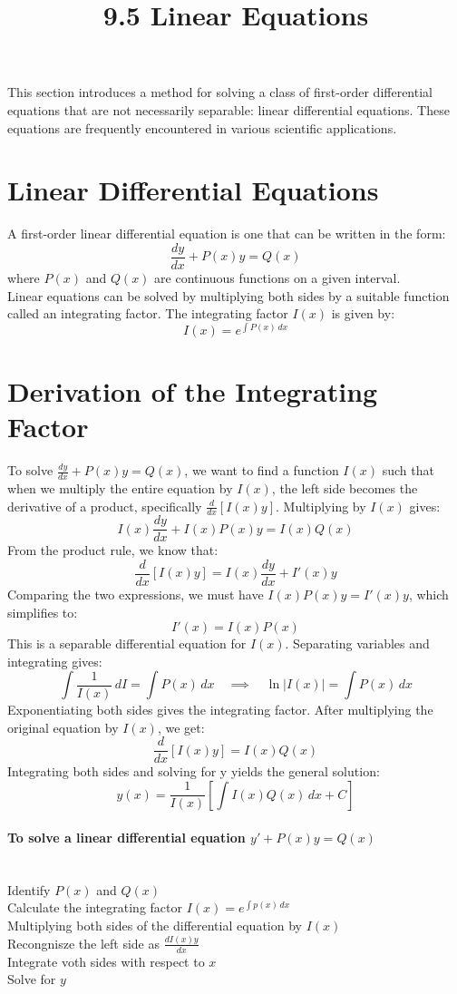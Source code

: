 \documentclass{article}
\title{9.5 Linear Equations}
\date{}
\begin{document}
\maketitle
This section introduces a method for solving a class of first-order differential equations that are not necessarily separable: linear differential equations. These equations are frequently encountered in various scientific applications.

\section*{Linear Differential Equations}

A first-order linear differential equation is one that can be written in the form:
\[\frac{dy}{dx} + P(x)y = Q(x)\]
where $P(x)$ and $Q(x)$ are continuous functions on a given interval. 
\\Linear equations can be solved by multiplying both sides by a suitable function called an integrating factor. The integrating factor $I(x)$ is given by:
\[I(x) = e^{\int P(x) \, dx}\]

\section*{Derivation of the Integrating Factor}
To solve $\frac{dy}{dx} + P(x)y = Q(x)$, we want to find a function $I(x)$ such that when we multiply the entire equation by $I(x)$, the left side becomes the derivative of a product, specifically $\frac{d}{dx}[I(x)y]$. Multiplying by $I(x)$ gives:
\[I(x)\frac{dy}{dx} + I(x)P(x)y = I(x)Q(x)\]
From the product rule, we know that:
\[\frac{d}{dx}[I(x)y] = I(x)\frac{dy}{dx} + I'(x)y\]
Comparing the two expressions, we must have $I(x)P(x)y = I'(x)y$, which simplifies to:
\[I'(x) = I(x)P(x)\]
This is a separable differential equation for $I(x)$. Separating variables and integrating gives:
\[\int \frac{1}{I(x)} \, dI = \int P(x) \, dx \quad \implies \quad \ln|I(x)| =\int P(x)\, dx\]
Exponentiating both sides gives the integrating factor. After multiplying the original equation by $I(x)$, we get:
\[\frac{d}{dx}[I(x)y] = I(x)Q(x)\]
Integrating both sides and solving for y yields the general solution:
\[y(x) = \frac{1}{I(x)} \left[ \int I(x)Q(x) \, dx + C \right]\]

\paragraph{To solve a linear differential equation $y'+P(x)y=Q(x)$}
\\Identify $P(x)$ and $Q(x)$ \\
Calculate the integrating factor $I(x) = e^{\int p(x) \, dx}$\\
Multiplying both sides of the differential equation by $I(x)$ \\
Recongnisze the left side as $\frac{dI(x)y}{dx}$\\
Integrate voth sides with respect to $x$\\
Solve for $y$\\
\end{document}
